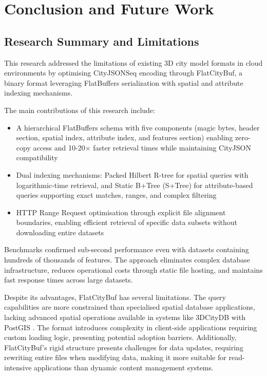 \chapter{Conclusion and Future Work}
\label{chp:conclusion}

\section{Research Summary and Limitations}
\label{conclusion:research_summary}

This research addressed the limitations of existing 3D city model formats in cloud environments by optimising CityJSONSeq encoding through FlatCityBuf, a binary format leveraging FlatBuffers serialization with spatial and attribute indexing mechanisms.

The main contributions of this research include:

\begin{itemize}
  \item A hierarchical FlatBuffers schema with five components (magic bytes, header section, spatial index, attribute index, and features section) enabling zero-copy access and 10-20× faster retrieval times while maintaining CityJSON compatibility

  \item Dual indexing mechanisms: Packed Hilbert R-tree for spatial queries with logarithmic-time retrieval, and Static B+Tree (S+Tree) for attribute-based queries supporting exact matches, ranges, and complex filtering

  \item HTTP Range Request optimisation through explicit file alignment boundaries, enabling efficient retrieval of specific data subsets without downloading entire datasets
\end{itemize}

Benchmarks confirmed sub-second performance even with datasets containing hundreds of thousands of features. The approach eliminates complex database infrastructure, reduces operational costs through static file hosting, and maintains fast response times across large datasets.

Despite its advantages, FlatCityBuf has several limitations. The query capabilities are more constrained than specialised spatial database applications, lacking advanced spatial operations available in systems like 3DCityDB \citep{3dcitydb} with PostGIS \citep{postgis}. The format introduces complexity in client-side applications requiring custom loading logic, presenting potential adoption barriers. Additionally, FlatCityBuf's rigid structure presents challenges for data updates, requiring rewriting entire files when modifying data, making it more suitable for read-intensive applications than dynamic content management systems.


